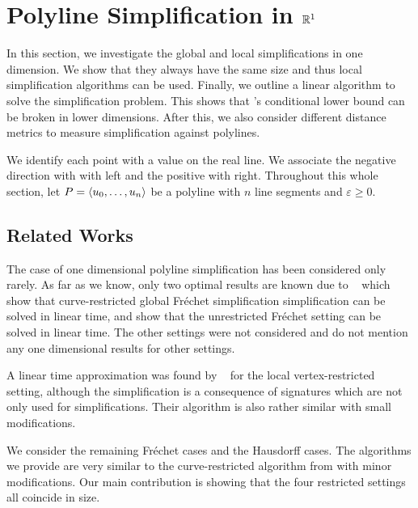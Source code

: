 \section{Polyline Simplification in \(\mathbb{R}^1\)}\label{sec:dimension_one}
In this section, we investigate the global and local simplifications in one dimension. We show that they always have the same size and thus local simplification algorithms can be used. Finally, we outline a linear algorithm to solve the simplification problem. This shows that \citeauthor{polyline_simplification_has_cubic_complexity_bringmannetal}'s conditional lower bound can be broken in lower dimensions. After this, we also consider different distance metrics to measure simplification against polylines.

We identify each point with a value on the real line. We associate the negative direction with with left and the positive with right. Throughout this whole section, let \(P = \left\langle u_0, \dots, u_n\right\rangle\) be a polyline with \(n\) line segments and \(\varepsilon \geq 0\).

\subsection{Related Works}
The case of one dimensional polyline simplification has been considered only rarely. As far as we know, only two optimal results are known due to \citeauthor{global_curve_simplification}~\cite{global_curve_simplification} which show that curve-restricted global Fréchet simplification simplification can be solved in linear time, and \citeauthor{min_complexity_1d_unrestricted}\cite{min_complexity_1d_unrestricted} show that the unrestricted Fréchet setting can be solved in linear time. The other settings were not considered and \citeauthor{global_curve_simplification} do not mention any one dimensional results for other settings. 

A linear time approximation was found by \citeauthor{clustering_time_series}~\cite{clustering_time_series} for the local vertex-restricted setting, although the simplification is a consequence of signatures which are not only used for simplifications. Their algorithm is also rather similar with small modifications.

We consider the remaining Fréchet cases and the Hausdorff cases. The algorithms we provide are very similar to the curve-restricted algorithm from \citeauthor{global_curve_simplification} with minor modifications. Our main contribution is showing that the four restricted settings all coincide in size.

